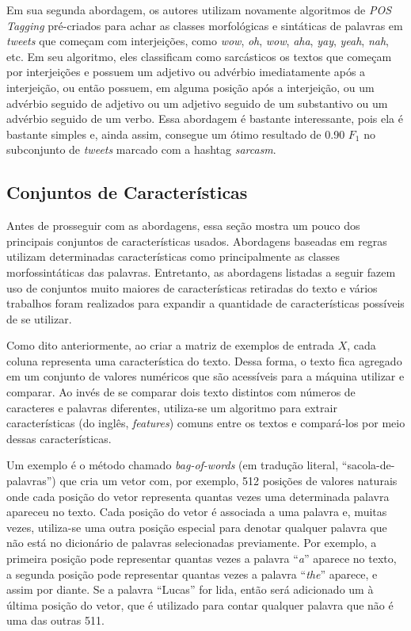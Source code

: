 Em sua segunda abordagem, os autores utilizam novamente algoritmos de
\textit{POS Tagging} pré-criados para achar as classes morfológicas e sintáticas
de palavras em \textit{tweets} que começam com interjeições, como \textit{wow},
\textit{oh}, \textit{wow}, \textit{aha}, \textit{yay}, \textit{yeah},
\textit{nah}, etc. Em seu algoritmo, eles classificam como sarcásticos os textos
que começam por interjeições e possuem um adjetivo ou advérbio imediatamente
após a interjeição, ou então possuem, em alguma posição após a interjeição, ou um
advérbio seguido de adjetivo ou um adjetivo seguido de um substantivo ou um
advérbio seguido de um verbo. Essa abordagem é bastante interessante, pois ela é
bastante simples e, ainda assim, consegue um ótimo resultado de 0.90 $F_1$ no
subconjunto de \textit{tweets} marcado com a hashtag \textit{sarcasm}.

\subsection{Conjuntos de Características}%
\label{sub:conjuntos-de-caracteristicas}

Antes de prosseguir com as abordagens, essa seção mostra um pouco dos
principais conjuntos de características usados. Abordagens
baseadas em regras utilizam determinadas características como principalmente as
classes morfossintáticas das palavras. Entretanto, as abordagens listadas a
seguir fazem uso de conjuntos muito maiores de características retiradas do
texto e vários trabalhos foram realizados para expandir a quantidade de
características possíveis de se utilizar.

Como dito anteriormente, ao criar a matriz de exemplos de entrada $X$, cada
coluna representa uma característica do texto. Dessa forma, o texto fica
agregado em um conjunto de valores numéricos que são acessíveis para a máquina
utilizar e comparar. Ao invés de se comparar dois texto distintos com números de
caracteres e palavras diferentes, utiliza-se um algoritmo para extrair
características (do inglês, \textit{features}) comuns entre os textos e
compará-los por meio dessas características.

Um exemplo é o método chamado \textit{bag-of-words} (em tradução literal,
``sacola-de-palavras'') que cria um vetor com, por exemplo, 512 posições de
valores naturais onde cada posição do vetor representa quantas vezes uma
determinada palavra  apareceu no texto. Cada posição do vetor é associada a uma
palavra e, muitas vezes, utiliza-se uma outra posição especial para denotar
qualquer palavra que não está no dicionário de palavras selecionadas
previamente. Por exemplo, a primeira posição pode representar quantas vezes a
palavra ``\textit{a}'' aparece no texto, a segunda posição pode representar
quantas vezes a palavra ``\textit{the}'' aparece, e assim por diante. Se a
palavra ``Lucas'' for lida, então será adicionado um à última posição do vetor,
que é utilizado para contar qualquer palavra que não é uma das outras 511.

